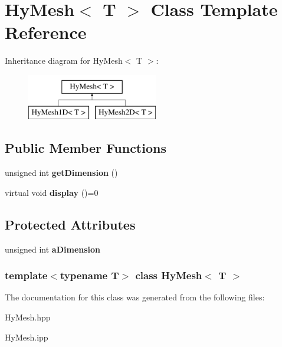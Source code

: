 \hypertarget{classHyMesh}{
\section{HyMesh$<$ T $>$ Class Template Reference}
\label{classHyMesh}
}
Inheritance diagram for HyMesh$<$ T $>$:\begin{figure}[H]
\begin{center}
\leavevmode
\includegraphics[height=2cm]{classHyMesh}
\end{center}
\end{figure}
\subsection*{Public Member Functions}
\begin{DoxyCompactItemize}
\item 
\hypertarget{classHyMesh_a45186552fa4dae91f6e9bbd4237d85a9}{
unsigned int {\bfseries getDimension} ()}
\label{classHyMesh_a45186552fa4dae91f6e9bbd4237d85a9}

\item 
\hypertarget{classHyMesh_a1d72d00c1ff7bf98d9d18eafdf729b69}{
virtual void {\bfseries display} ()=0}
\label{classHyMesh_a1d72d00c1ff7bf98d9d18eafdf729b69}

\end{DoxyCompactItemize}
\subsection*{Protected Attributes}
\begin{DoxyCompactItemize}
\item 
\hypertarget{classHyMesh_ae1a78ec74b87c3646d2e9cad978546f8}{
unsigned int {\bfseries aDimension}}
\label{classHyMesh_ae1a78ec74b87c3646d2e9cad978546f8}

\end{DoxyCompactItemize}
\subsubsection*{template$<$typename T$>$ class HyMesh$<$ T $>$}



The documentation for this class was generated from the following files:\begin{DoxyCompactItemize}
\item 
HyMesh.hpp\item 
HyMesh.ipp\end{DoxyCompactItemize}

